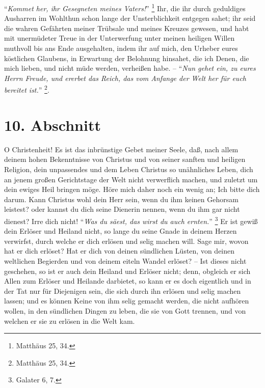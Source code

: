 "`\textit{Kommet her, ihr Gesegneten meines Vaters!}"' \footnote{Matthäus 25, 34.} 
Ihr, die ihr durch geduldiges Ausharren im Wohlthun schon lange der Unsterblichkeit entgegen sahet;
ihr seid die wahren Gefährten meiner Trübsale und meines Kreuzes gewesen, und habt mit unermüdeter Treue in der Unterwerfung unter meinen heiligen Willen muthvoll bis ans Ende ausgehalten, indem ihr auf mich, den Urheber eures köstlichen Glaubens, in Erwartung der Belohnung hinsahet, die ich Denen, die mich lieben, und nicht müde werden, verheißen habe.
-- "`\textit{Nun gehet ein, zu eures Herrn Freude, und ererbet das Reich, das vom Anfange der Welt her für euch bereitet ist.}"' \footnote{Matthäus 25, 34.}.

\section{10. Abschnitt}

O Christenheit!
Es ist das inbrünstige Gebet meiner Seele, daß, nach allem deinem hohen Bekenntnisse von Christus und von seiner sanften und heiligen Religion, dein unpassendes und dem Leben Christus so unähnliches Leben, dich an jenem großen Gerichtstage der Welt nicht verwerflich machen, und zuletzt um dein ewiges Heil bringen möge.
Höre mich daher noch ein wenig an;
Ich bitte dich darum.
Kann Christus wohl dein Herr sein, wenn du ihm keinen Gehorsam leistest?
oder kannst du dich seine Dienerin nennen, wenn du ihm gar nicht dienest? Irre dich nicht!
"`\textit{Was du säest, das wirst du auch ernten.}"' \footnote{Galater 6, 7.} 
Er ist gewiß dein Erlöser und Heiland nicht, so lange du seine Gnade in deinem Herzen verwirfst, durch welche er dich erlösen und selig machen will.
Sage mir, wovon hat er dich erlöset? 
Hat er dich von deinen sündlichen Lüsten, von deinen weltlichen Begierden und von deinem eiteln Wandel erlöset?
-- Ist dieses nicht geschehen, so ist er auch dein Heiland und Erlöser nicht;
denn, obgleich er sich Allen zum Erlöser und Heilande darbietet, so kann er es doch eigentlich und in der Tat nur für Diejenigen sein, die sich durch ihn erlösen und selig machen lassen;
und es können Keine von ihm selig gemacht werden, die nicht aufhören wollen, in den sündlichen Dingen zu leben, die sie von Gott trennen, und von welchen er sie zu erlösen in die Welt kam.

\medskip

